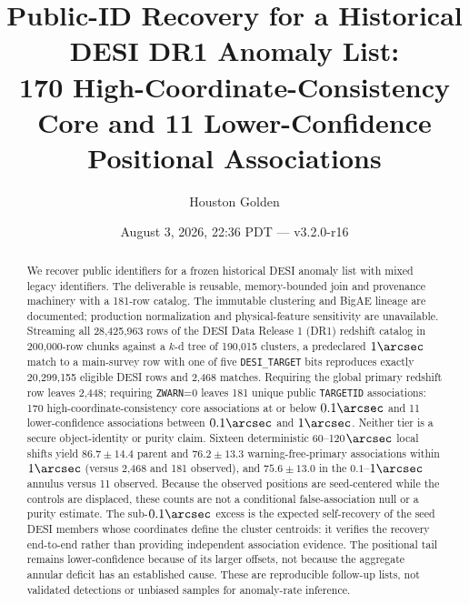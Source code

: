 \documentclass[twocolumn,linenumbers]{aastex702}
\newcommand{\paperVersion}{v3.2.0-r16}
\newcommand{\paperTimestamp}{August 3, 2026, 22:36 PDT}
\begin{document}
\title{Public-ID Recovery for a Historical DESI DR1 Anomaly List:\\
170 High-Coordinate-Consistency Core and 11 Lower-Confidence Positional Associations}

\author{Houston Golden}
\date{\paperTimestamp{} --- \paperVersion}

\begin{abstract}
We recover public identifiers for a frozen historical DESI anomaly list with mixed legacy
identifiers.  The deliverable is reusable, memory-bounded join and provenance machinery with a
181-row catalog.  The immutable clustering and BigAE lineage are documented; production
normalization and physical-feature sensitivity are unavailable.  Streaming all 28,425,963
rows of the DESI Data Release 1 (DR1) redshift catalog in 200,000-row chunks against a $k$-d
tree of 190,015 clusters, a predeclared $1\arcsec$ match to a main-survey row with one of five
\texttt{DESI\_TARGET} bits reproduces exactly 20,299,155 eligible DESI rows and 2,468 matches.
Requiring the global primary redshift row leaves 2,448; requiring \texttt{ZWARN}=0 leaves 181
unique public \texttt{TARGETID} associations: 170 high-coordinate-consistency core associations at or below
$0.1\arcsec$ and 11 lower-confidence associations between $0.1\arcsec$ and $1\arcsec$.  Neither
tier is a secure object-identity or purity claim.  Sixteen deterministic 60--120$\arcsec$ local
shifts yield $86.7\pm14.4$ parent and $76.2\pm13.3$ warning-free-primary associations within
$1\arcsec$ (versus 2,468 and 181 observed), and $75.6\pm13.0$ in the $0.1$--$1\arcsec$ annulus
versus 11 observed.  Because the observed positions are seed-centered while the controls are
displaced, these counts are not a conditional false-association null or a purity estimate.  The
sub-$0.1\arcsec$ excess is the expected self-recovery of the seed DESI members whose coordinates
define the cluster centroids: it verifies the recovery end-to-end rather than providing
independent association evidence.  The positional tail remains lower-confidence because of its
larger offsets, not because the aggregate annular deficit has an established cause.  These are
reproducible follow-up lists, not validated detections or
unbiased samples for anomaly-rate inference.
\end{abstract}
\end{document}
